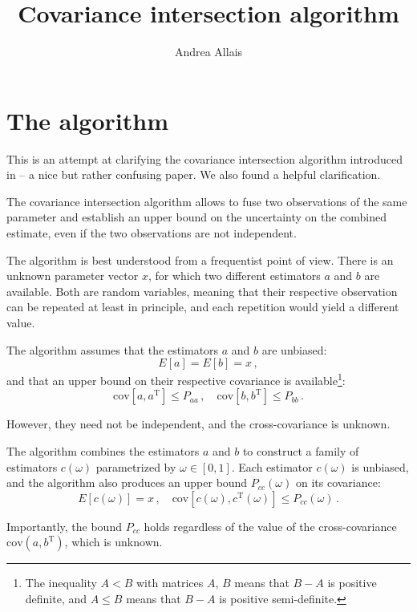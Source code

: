 \documentclass[11pt]{article}
\title{Covariance intersection algorithm}
\author{Andrea Allais}
\date{}
\newcommand{\cov}{\mathrm{cov}}
\newcommand{\transpose}{\mathrm{\scriptscriptstyle T}}
\begin{document}
\maketitle
\section{The algorithm}

This is an attempt at clarifying the covariance intersection algorithm
introduced in \cite{julier1997} -- a nice but rather confusing paper. We also
found \cite{chen2002} a helpful clarification.

The covariance intersection algorithm allows to fuse two observations of the
same parameter and establish an upper bound on the uncertainty on the combined
estimate, even if the two observations are not independent.

The algorithm is best understood from a frequentist point of view. There is an
unknown parameter vector $x$, for which two different estimators $a$ and $b$
are available. Both are random variables, meaning that their respective
observation can be repeated at least in principle, and each repetition would
yield a different value. 

The algorithm assumes that the estimators $a$ and $b$ are unbiased:
\begin{equation}
E[a] = E[b] = x\,,
\end{equation}
and that an upper bound on their respective covariance is
available\footnote{The inequality $A < B$ with matrices $A$, $B$ means that $B
- A$ is positive definite, and $A \le B$ means that $B - A$ is positive
semi-definite.}:
\begin{equation}
\cov \left[a, a^\transpose\right] \le P_{aa}\,,\quad
\cov \left[b, b^\transpose\right] \le P_{bb}\,.
\end{equation}

However, they need not be independent, and the cross-covariance is unknown.

The algorithm combines the estimators $a$ and $b$ to construct a family of
estimators $c(\omega)$ parametrized by $\omega \in [0, 1]$.  Each estimator
$c(\omega)$ is unbiased, and the algorithm also produces an upper bound
$P_{cc}(\omega)$ on its covariance:
\begin{equation}
    E[c(\omega)] = x\,,\quad
    \cov \left[c(\omega), c^\transpose(\omega)\right] \le P_{cc}(\omega)\,.
\end{equation}

Importantly, the bound $P_{cc}$ holds regardless of the value of the
cross-covariance $\cov(a, b^\transpose)$, which is unknown.
\end{document}
